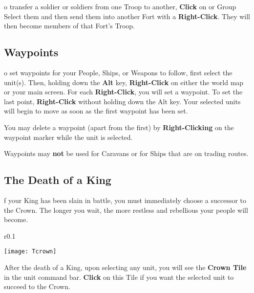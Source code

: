 o transfer a soldier or soldiers from one Troop to another, \textbf{Click} on or Group Select them and then send them into another Fort with a \textbf{Right-Click}. They will then become members of that Fort’s Troop.

\subsection{\textsf{Waypoints}}



o set waypoints for your People, Ships, or Weapons to follow, first select the unit(s). Then, holding down the \textbf{Alt} key, \textbf{Right-Click} on either the world map or your main screen. For each \textbf{Right-Click}, you will set a waypoint. To set the last point, \textbf{Right-Click} without holding down the Alt key. Your selected units will begin to move as soon as the first waypoint has been set.

You may delete a waypoint (apart from the first) by \textbf{Right-Clicking} on the waypoint marker while the unit is selected.

Waypoints may \textbf{not} be used for Caravans or for Ships that are on trading routes.

\subsection{\textsf{The Death of a King}}


f your King has been slain in battle, you must immediately choose a successor to the Crown. The longer you wait, the more restless and rebellious your people will become.

\begin{wrapfigure}{r}{0.1\textwidth}
    \vspace{-20pt}
    \begin{center}
        \texttt{[image: Tcrown]}
    \end{center}
    \vspace{-20pt}
\end{wrapfigure}


After the death of a King, upon selecting any unit, you will see the \textbf{Crown Tile} in the unit command bar. \textbf{Click} on this Tile if you want the selected unit to succeed to the Crown.

